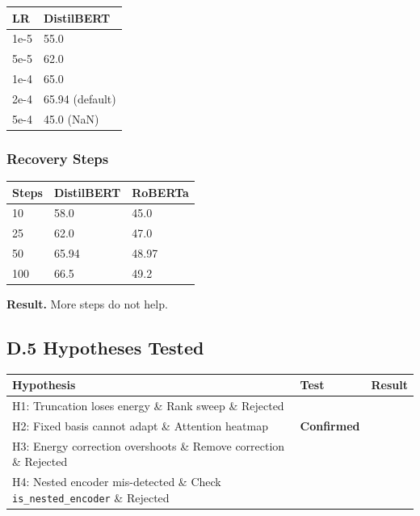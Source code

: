 \begin{table}[H]
\centering
\small
\begin{tabular}{ll}
\toprule
\textbf{LR} & \textbf{DistilBERT} \\
\midrule
1e-5 & 55.0 \\
5e-5 & 62.0 \\
1e-4 & 65.0 \\
2e-4 & 65.94 (default) \\
5e-4 & 45.0 (NaN) \\
\bottomrule
\end{tabular}
\end{table}

\subsubsection{Recovery Steps}

\begin{table}[H]
\centering
\small
\begin{tabular}{lll}
\toprule
\textbf{Steps} & \textbf{DistilBERT} & \textbf{RoBERTa} \\
\midrule
10 & 58.0 & 45.0 \\
25 & 62.0 & 47.0 \\
50 & 65.94 & 48.97 \\
100 & 66.5 & 49.2 \\
\bottomrule
\end{tabular}
\end{table}

\textbf{Result.} More steps do not help.

\subsection{D.5 Hypotheses Tested}

\begin{table}[H]
\centering
\small
\begin{tabular}{lll}
\toprule
\textbf{Hypothesis} & \textbf{Test} & \textbf{Result} \\
\midrule
H1: Truncation loses energy \& Rank sweep \& Rejected \\
H2: Fixed basis cannot adapt \& Attention heatmap & \textbf{Confirmed} \\
H3: Energy correction overshoots \& Remove correction \& Rejected \\
H4: Nested encoder mis-detected \& Check \texttt{is\_nested\_encoder} \& Rejected \\
\bottomrule
\end{tabular}
\end{table}

